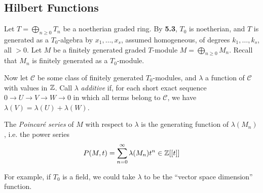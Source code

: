 \documentclass[10pt,a4paper]{article}
\begin{document}
\subsection{Hilbert Functions}
Let $T = \bigoplus_{n\geq 0}T_n$ be a noetherian graded ring. By \textbf{5.3}, $T_0$ is noetherian, and $T$ is generated as a $T_0$-algebra by $x_1, \ldots, x_s$, assumed homogeneous, of degrees $k_1, \ldots, k_s$, all $>0$. Let $M$ be a finitely generated graded $T$-module $M = \bigoplus_{n\geq 0}M_n$. Recall that $M_n$ is finitely generated as a $T_0$-module.

Now let $\mathscr{C}$ be some class of finitely generated $T_0$-modules, and $\lambda$ a function of $\mathscr{C}$ with values in $\mathbb{Z}$. Call $\lambda$ \emph{additive} if, for each short exact sequence $0 \to U \to V \to W \to 0$ in which all terms belong to $\mathscr{C}$, we have $\lambda(V) = \lambda(U) + \lambda(W)$.

\begin{definition}
  The \emph{Poincar\'e series} of $M$ with respect to $\lambda$ is the generating function of $\lambda(M_n)$, i.e. the power series
  \[P(M, t) = \sum_{n=0}^\infty \lambda(M_n)t^n \in \mathbb{Z}[[t]]\]
\end{definition}
For example, if $T_0$ is a field, we could take $\lambda$ to be the ``vector space dimension'' function.
\end{document}
